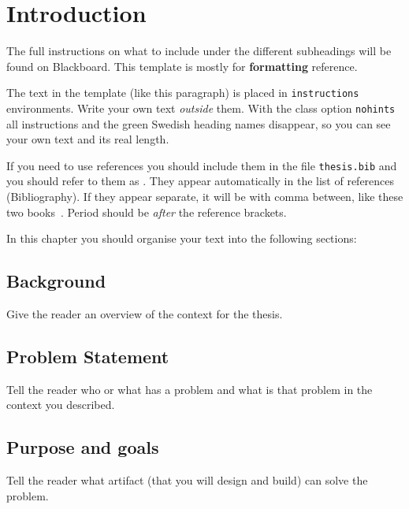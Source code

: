 \chapter{Introduction}
\label{chap:intro}
\begin{instructions}
The full instructions on what to include under the different subheadings will be found on Blackboard. This template is mostly for \textbf{formatting} reference.


The text in the template (like this paragraph) is placed in \texttt{instructions} environments. Write your own text \emph{outside} them. With the class option \texttt{nohints} all instructions and the green Swedish heading names disappear, so you can see your own text and its real length.

If you need to use references you should include them in the file \texttt{thesis.bib} and you should refer to them as \cite{wu2011, overleaf, oetiker2001not}. They appear automatically in the list of references (Bibliography). If they appear separate, it will be with comma between, like these two books~\cite{wu2011, oetiker2001not}. Period should be \emph{after} the reference brackets.

In this chapter you should organise your text into the following sections:
\end{instructions}

\section{Background}
\label{sec:bgd}
\begin{instructions}
Give the reader an overview of the context for the thesis.
\end{instructions}

\section{Problem Statement}
\label{sec:problem}
\begin{instructions}
Tell the reader who or what has a problem and what is that problem in the context you described.
\end{instructions}

\section{Purpose and goals}
\label{sec:purpose}
\begin{instructions}
Tell the reader what artifact (that you will design and build) can solve the problem.
\end{instructions}

